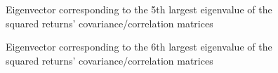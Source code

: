 \documentclass{article}
\begin{document}
\begin{figure}[htb!]
  \centering
  \caption{Eigenvector corresponding to the 5th largest eigenvalue of the squared returns' covariance/correlation matrices}
\end{figure}

\begin{figure}[htb!]
  \centering
  \caption{Eigenvector corresponding to the 6th largest eigenvalue of
    the squared returns' covariance/correlation matrices}
\end{figure}




\end{document}
